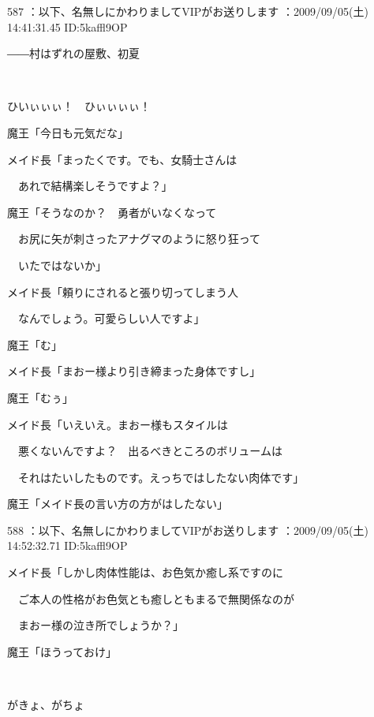 \documentclass[a4j,twocolumn]{tarticle}
\begin{document}
	
    
    

587 ：以下、名無しにかわりましてVIPがお送りします ：2009/09/05(土) 14:41:31.45 ID:5kaffl9OP 


――村はずれの屋敷、初夏 

　

ひいぃぃぃ！　ひぃぃぃぃ！ 



魔王「今日も元気だな」 



メイド長「まったくです。でも、女騎士さんは\par{} 
　あれで結構楽しそうですよ？」 



魔王「そうなのか？　勇者がいなくなって\par{} 
　お尻に矢が刺さったアナグマのように怒り狂って\par{} 
　いたではないか」



メイド長「頼りにされると張り切ってしまう人\par{} 
　なんでしょう。可愛らしい人ですよ」 



魔王「む」\par{} 
メイド長「まおー様より引き締まった身体ですし」 



魔王「むぅ」\par{} 
メイド長「いえいえ。まおー様もスタイルは\par{} 
　悪くないんですよ？　出るべきところのボリュームは \par{}
　それはたいしたものです。えっちではしたない肉体です」 



魔王「メイド長の言い方の方がはしたない」 

	
    
    

588 ：以下、名無しにかわりましてVIPがお送りします ：2009/09/05(土) 14:52:32.71 ID:5kaffl9OP 


メイド長「しかし肉体性能は、お色気か癒し系ですのに\par{} 
　ご本人の性格がお色気とも癒しともまるで無関係なのが\par{} 
　まおー様の泣き所でしょうか？」 



魔王「ほうっておけ」 

　

がきょ、がちょ 
\end{document}
